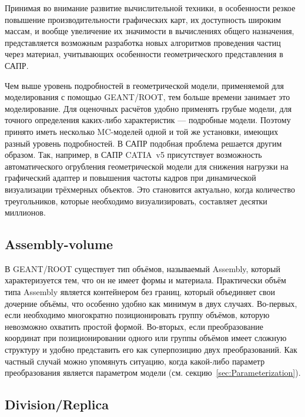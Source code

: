 Принимая во внимание развитие вычислительной техники, в особенности резкое повышение производительности графических карт, их доступность широким массам, и вообще увеличение их значимости в вычислениях общего назначения, представляется возможным разработка новых алгоритмов проведения частиц через материал, учитывающих особенности геометрического представления в САПР.

Чем выше уровень подробностей в геометрической модели, применяемой для моделирования с помощью GEANT/ROOT, тем больше времени занимает это моделирование. Для оценочных расчётов удобно применять грубые модели, для точного определения каких-либо характеристик --- подробные модели. Поэтому принято иметь несколько MC-моделей одной и той же установки, имеющих разный уровень подробностей.
В САПР подобная проблема решается другим образом. Так, например, в САПР CATIA~v5 присутствует возможность автоматического огрубления геометрической модели для снижения нагрузки на графический адаптер и повышения частоты кадров при динамической визуализации трёхмерных объектов. Это становится актуально, когда количество треугольников, которые необходимо визуализировать, составляет десятки миллионов.

\subsection{Assembly-volume}

В GEANT/ROOT существует тип объёмов, называемый Assembly, который характеризуется тем, что он не имеет формы и материала. Практически объём типа Assembly является контейнером без границ, который объединяет свои дочерние объёмы, что особенно удобно как минимум в двух случаях. Во-первых, если необходимо многократно позиционировать группу объёмов, которую невозможно охватить простой формой. Во-вторых, если преобразование координат при позиционировании одного или группы объёмов имеет сложную структуру и удобно представить его как суперпозицию двух преобразований. Как частный случай можно упомянуть ситуацию, когда какой-либо параметр преобразования является параметром модели (см. секцию~\ref{sec:Parameterization}).

\subsection{Division/Replica}

